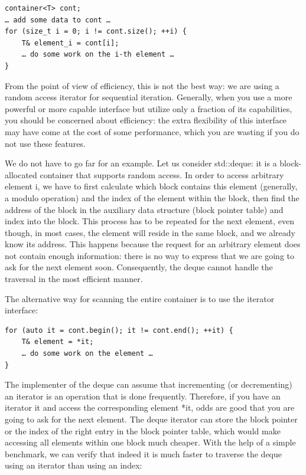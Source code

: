 \begin{lstlisting}[style=styleCXX]
container<T> cont;
… add some data to cont …
for (size_t i = 0; i != cont.size(); ++i) {
	T& element_i = cont[i];
	… do some work on the i-th element …
}
\end{lstlisting}

From the point of view of efficiency, this is not the best way: we are using a random access iterator for sequential iteration. Generally, when you use a more powerful or more capable interface but utilize only a fraction of its capabilities, you should be concerned about efficiency: the extra flexibility of this interface may have come at the cost of some performance, which you are wasting if you do not use these features. 

We do not have to go far for an example. Let us consider std::deque: it is a block-allocated container that supports random access. In order to access arbitrary element i, we have to first calculate which block contains this element (generally, a modulo operation) and the index of the element within the block, then find the address of the block in the auxiliary data structure (block pointer table) and index into the block. This process has to be repeated for the next element, even though, in most cases, the element will reside in the same block, and we already know its address. This happens because the request for an arbitrary element does not contain enough information: there is no way to express that we are going to ask for the next element soon. Consequently, the deque cannot handle the traversal in the most efficient manner.

The alternative way for scanning the entire container is to use the iterator interface:

\begin{lstlisting}[style=styleCXX]
for (auto it = cont.begin(); it != cont.end(); ++it) {
	T& element = *it;
	… do some work on the element …
}
\end{lstlisting}

The implementer of the deque can assume that incrementing (or decrementing) an iterator is an operation that is done frequently. Therefore, if you have an iterator it and access the corresponding element *it, odds are good that you are going to ask for the next element. The deque iterator can store the block pointer or the index of the right entry in the block pointer table, which would make accessing all elements within one block much cheaper. With the help of a simple benchmark, we can verify that indeed it is much faster to traverse the deque using an iterator than using an index:


